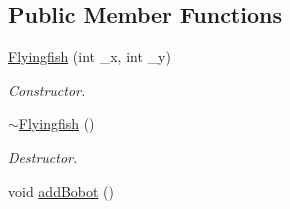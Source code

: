 \subsection*{Public Member Functions}
\begin{DoxyCompactItemize}
\item 
\hyperlink{classFlyingfish_a638286b5ea18b0db89c92c07553c05b3}{Flyingfish} (int \-\_\-x, int \-\_\-y)
\begin{DoxyCompactList}\small\item\em Constructor. \end{DoxyCompactList}\item 
\hypertarget{classFlyingfish_a8c3d3d1e4a09180306bb950dd71753c9}{\hyperlink{classFlyingfish_a8c3d3d1e4a09180306bb950dd71753c9}{$\sim$\-Flyingfish} ()}\label{classFlyingfish_a8c3d3d1e4a09180306bb950dd71753c9}

\begin{DoxyCompactList}\small\item\em Destructor. \end{DoxyCompactList}\item 
\hypertarget{classFlyingfish_a270d59756576de58bfedfde1607adbfe}{void \hyperlink{classFlyingfish_a270d59756576de58bfedfde1607adbfe}{add\-Bobot} ()}\label{classFlyingfish_a270d59756576de58bfedfde1607adbfe}


\end{DoxyCompactItemize}

